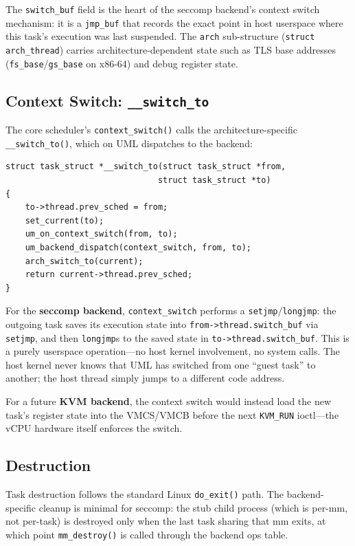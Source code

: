 The \texttt{switch\_buf} field is the heart of the seccomp backend's context
switch mechanism: it is a \texttt{jmp\_buf} that records the exact point in
host userspace where this task's execution was last suspended.  The
\texttt{arch} sub-structure (\texttt{struct arch\_thread}) carries
architecture-dependent state such as TLS base addresses
(\texttt{fs\_base}/\texttt{gs\_base} on x86-64) and debug register state.

\subsection{Context Switch: \texttt{\_\_switch\_to}}
\label{sec:impl-context-switch}

The core scheduler's \texttt{context\_switch()} calls the architecture-specific
\texttt{\_\_switch\_to()}, which on UML dispatches to the backend:

\begin{lstlisting}[language=KernelC,caption={UML context switch},label=lst:switch-to]
struct task_struct *__switch_to(struct task_struct *from,
                               struct task_struct *to)
{
    to->thread.prev_sched = from;
    set_current(to);
    um_on_context_switch(from, to);
    um_backend_dispatch(context_switch, from, to);
    arch_switch_to(current);
    return current->thread.prev_sched;
}
\end{lstlisting}

For the \textbf{seccomp backend}, \texttt{context\_switch} performs a
\texttt{setjmp}/\texttt{longjmp}: the outgoing task saves its execution state
into \texttt{from->thread.switch\_buf} via \texttt{setjmp}, and then
\texttt{longjmp}s to the saved state in \texttt{to->thread.switch\_buf}.  This
is a purely userspace operation---no host kernel involvement, no system calls.
The host kernel never knows that UML has switched from one ``guest task'' to
another; the host thread simply jumps to a different code address.

For a future \textbf{KVM backend}, the context switch would instead
load the new task's register state into the VMCS/VMCB before the next
\texttt{KVM\_RUN} ioctl---the vCPU hardware itself enforces the switch.

\subsection{Destruction}

Task destruction follows the standard Linux \texttt{do\_exit()} path.  The
backend-specific cleanup is minimal for seccomp: the stub child process
(which is per-mm, not per-task) is destroyed only when the last task sharing
that mm exits, at which point \texttt{mm\_destroy()} is called through the
backend ops table.

